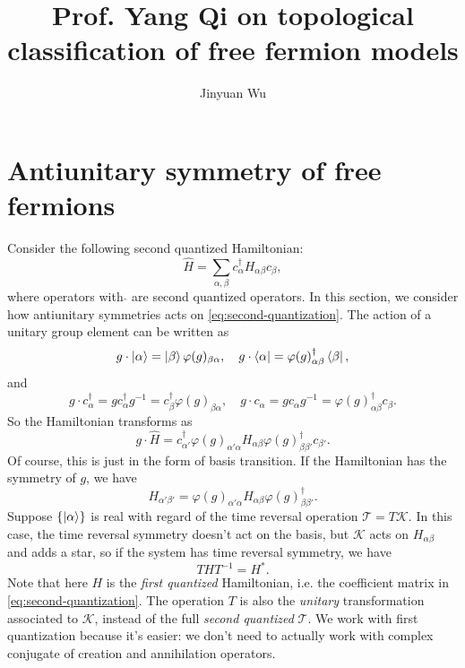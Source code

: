 \documentclass[hyperref, a4paper]{article}
\title{Prof. Yang Qi on topological classification of free fermion models}
\author{Jinyuan Wu}
\begin{document}
\maketitle

\section{Antiunitary symmetry of free fermions}

Consider the following second quantized Hamiltonian:
\begin{equation}
    \hat{H} = \sum_{\alpha, \beta} c^\dagger_\alpha H_{\alpha \beta} c_\beta,
    \label{eq:second-quantization}
\end{equation}
where operators with $\hat{}$ are second quantized operators. In this section, we consider how 
antiunitary symmetries acts on \eqref{eq:second-quantization}. The action of a unitary group element can be 
written as 
\begin{equation}
    g \cdot \ket{\alpha} = \ket{\beta} \varphi(g)_{\beta \alpha}, \quad 
    g \cdot \bra{\alpha} = \varphi(g)^\dagger_{\alpha \beta} \bra{\beta}, 
\end{equation}
and 
\begin{equation}
    g \cdot c^\dagger_\alpha = g c^\dagger_\alpha g^{-1} = c^\dagger_\beta \varphi(g)_{\beta \alpha}, \quad 
    g \cdot c_\alpha = g c_\alpha g^{-1} = \varphi(g)^\dagger_{\alpha \beta} c_\beta.
\end{equation}
So the Hamiltonian transforms as 
\begin{equation}
    g \cdot \hat{H} = c^\dagger_{\alpha'} \varphi(g)_{\alpha' \alpha} H_{\alpha \beta} \varphi(g)^\dagger_{\beta \beta'} c_{\beta'}.
\end{equation}
Of course, this is just in the form of basis transition. If the Hamiltonian has the symmetry of $g$, we have 
\begin{equation}
    H_{\alpha' \beta'} = \varphi(g)_{\alpha' \alpha} H_{\alpha \beta} \varphi(g)^\dagger_{\beta \beta'}.
\end{equation}
Suppose $\{\ket{\alpha}\}$ is real with regard of the time reversal operation $\mathcal{T} = T \mathcal{K}$.
In this case, the time reversal symmetry doesn't act on the basis, but $\mathcal{K}$ acts on $H_{\alpha \beta}$
and adds a star, so if the system has time reversal symmetry, we have 
\begin{equation}
    T H T^{-1} = {H}^*.
    \label{eq:time-reversal-first-quantization}
\end{equation}
Note that here $H$ is the \emph{first quantized} Hamiltonian, i.e. the coefficient matrix 
in \eqref{eq:second-quantization}. The operation $T$ is also the \emph{unitary} transformation associated 
to $\mathcal{K}$, instead of the full \emph{second quantized} $\mathcal{T}$. We work with first quantization
because it's easier: we don't need to actually work with complex conjugate of creation and annihilation operators.
\end{document}
